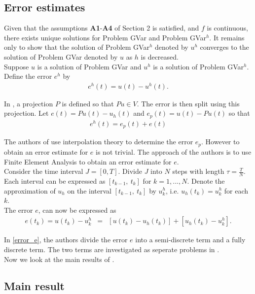 \documentclass[../../main.tex]{subfiles}
\begin{document}
\subsection{Error estimates}\label{e_est}
Given that the assumptions \textbf{A1}-\textbf{A4} of Section 2 is satisfied, and $f$ is continuous, there exists unique solutions for  Problem GVar and Problem GVar$^h$. It remains only to show that the solution of Problem GVar$^h$ denoted by $u^h$ converges to the solution of Problem GVar denoted by $u$ as $h$ is decreased.\\

Suppose $u$ is a solution of Problem GVar and $u^h$ is a solution of Problem GVar$^h$. Define the error $e^h$ by 
\begin{eqnarray*}
	e^h(t) = u(t) - u^h(t).
\end{eqnarray*}

In \cite{BV13}, a projection $P$ is defined so that $Pu \in V$. The error is then split using this projection. Let $e(t) = Pu(t)- u_h(t)$ and $e_p(t) = u(t) - Pu(t)$ so that 
\begin{eqnarray}
	e^h(t) = e_p(t) +e(t) \label{Error}
\end{eqnarray}

The authors of \cite{BV13} use interpolation theory to determine the error $e_p$. However to obtain an error estimate for $e$ is not trivial. The approach of the authors is to use Finite Element Analysis to obtain an error estimate for $e$.\\

Consider the time interval $J = [0,T]$. Divide $J$ into $N$ steps with length $\tau = \frac{T}{N}$. Each interval can be expressed as $[t_{k-1}, \ t_k]$ for $k = 1,...,N$. Denote the approximation of $u_h$ on the interval $[t_{k-1}, \ t_k]$ by $u_k^h$, i.e. $u_h(t_k) = u_k^h$ for each $k$.\\

The error $e$, can now be expressed as
\begin{eqnarray}
	e(t_k) = u(t_k) - u^h_k & = & [u(t_k)-u_h(t_k)] + [u_h(t_k) - u^h_k]. \label{error_e}
\end{eqnarray}

In \eqref{error_e}, the authors divide the error $e$ into a semi-discrete term and a fully discrete term. The two terms are investigated as seperate problems in \cite{BV13}.\\


Now we look at the main results of \cite{BV13}.
\subsection{Main result}
\end{document}
